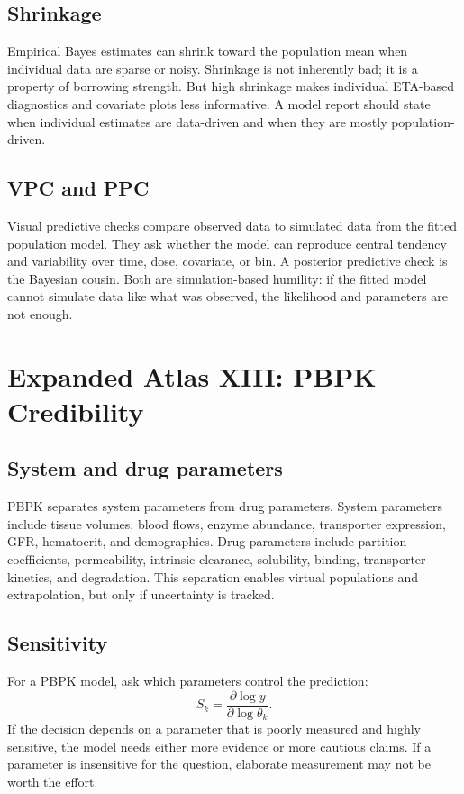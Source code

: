 \subsection{Shrinkage}

Empirical Bayes estimates can shrink toward the population mean when individual data are sparse or noisy. Shrinkage is not inherently bad; it is a property of borrowing strength. But high shrinkage makes individual ETA-based diagnostics and covariate plots less informative. A model report should state when individual estimates are data-driven and when they are mostly population-driven.

\subsection{VPC and PPC}

Visual predictive checks compare observed data to simulated data from the fitted population model. They ask whether the model can reproduce central tendency and variability over time, dose, covariate, or bin. A posterior predictive check is the Bayesian cousin. Both are simulation-based humility: if the fitted model cannot simulate data like what was observed, the likelihood and parameters are not enough.

\section{Expanded Atlas XIII: PBPK Credibility}

\subsection{System and drug parameters}

PBPK separates system parameters from drug parameters. System parameters include tissue volumes, blood flows, enzyme abundance, transporter expression, GFR, hematocrit, and demographics. Drug parameters include partition coefficients, permeability, intrinsic clearance, solubility, binding, transporter kinetics, and degradation. This separation enables virtual populations and extrapolation, but only if uncertainty is tracked.

\subsection{Sensitivity}

For a PBPK model, ask which parameters control the prediction:
\[
  S_k=\frac{\partial \log y}{\partial \log \theta_k}.
\]
If the decision depends on a parameter that is poorly measured and highly sensitive, the model needs either more evidence or more cautious claims. If a parameter is insensitive for the question, elaborate measurement may not be worth the effort.

